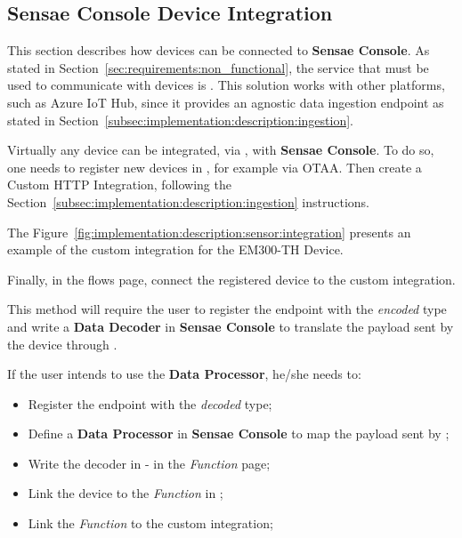 \subsection{Sensae Console Device Integration}
\label{subsec:implementation:description:sensor}

This section describes how devices can be connected to \textbf{Sensae Console}. As stated in Section~\ref{sec:requirements:non_functional}, the service that must be used to communicate with devices is . This solution works with other platforms, such as Azure IoT Hub, since it provides an agnostic data ingestion endpoint as stated in Section~\ref{subsec:implementation:description:ingestion}.

Virtually any device can be integrated, via , with \textbf{Sensae Console}. To do so, one needs to register new devices in , for example via \gls{OTAA}. Then create a Custom HTTP Integration, following the Section~\ref{subsec:implementation:description:ingestion} instructions.

The Figure~\ref{fig:implementation:description:sensor:integration} presents an example of the custom integration for the EM300-TH Device.

Finally, in the  flows page, connect the registered device to the custom integration.

This method will require the user to register the endpoint with the \textit{encoded} type and write a \textbf{Data Decoder} in \textbf{Sensae Console} to translate the payload sent by the device through .

If the user intends to use the \textbf{Data Processor}, he/she needs to:

\begin{itemize}
    \item Register the endpoint with the \textit{decoded} type;
    \item Define a \textbf{Data Processor} in \textbf{Sensae Console} to map the payload sent by ;
    \item Write the decoder in  - in the \textit{Function} page;
    \item Link the device to the \textit{Function} in ;
    \item Link the \textit{Function} to the custom integration;
\end{itemize}


